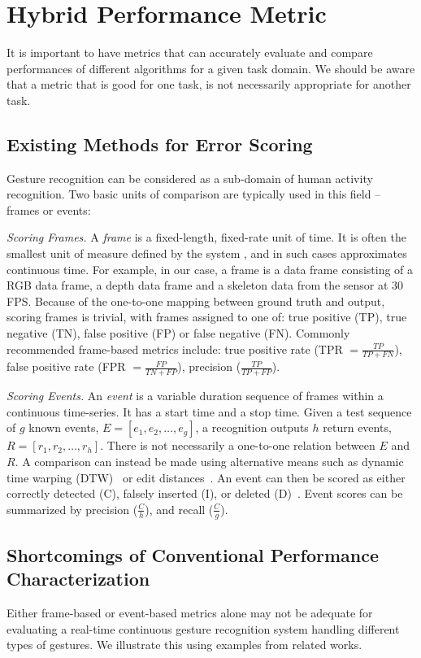 \chapter{Hybrid Performance Metric}
It is important to have metrics that can accurately evaluate and compare
performances of different algorithms for a given task domain. We should
be aware that a metric that is good for one task, is not
necessarily appropriate for another task. 

\section{Existing Methods for Error Scoring}
Gesture recognition can be considered as a sub-domain of human activity
recognition. Two basic units of comparison are typically used in this field
-- frames or events:

\textit{Scoring Frames.} A \textit{frame} is a fixed-length,
fixed-rate unit of time. It is often the smallest unit of measure defined by the system \cite{ward11}, and in such cases approximates continuous time.
For example, in our case, a frame is a data frame consisting of a RGB data frame, a depth data frame and a skeleton data from the
sensor at 30 FPS. Because of the one-to-one mapping between ground truth and
output, scoring frames is trivial, with frames assigned to one of: true positive
(TP), true negative (TN), false positive (FP) or false negative (FN). Commonly
recommended frame-based metrics include: true positive rate (TPR $= \frac{TP}{TP
+ FN}$), false positive rate (FPR $= \frac{FP}{TN + FP}$), precision
($\frac{TP}{TP + FP}$).

\textit{Scoring Events.} An \textit{event} is a variable duration sequence of
frames within a continuous time-series.  It has a start time and a stop time.
Given a test sequence of $g$ known events, $E = [e_1, e_2, \ldots, e_g]$, a
recognition outputs $h$ return events, $R = [r_1, r_2, \ldots, r_h]$. There is
not necessarily a one-to-one relation between $E$ and $R$. A comparison can
instead be made using alternative means such as dynamic time warping
(DTW)~\cite{berndt94} or edit distances~\cite{guyon13}. An event can then be
scored as either correctly detected (C), falsely inserted (I), or deleted
(D)~\cite{ward11}. Event scores can be summarized
by precision ($\frac{C}{h}$), and recall
($\frac{C}{g}$).

\section{Shortcomings of Conventional Performance Characterization}
Either frame-based or event-based metrics 
alone may not be adequate for evaluating a real-time continuous gesture recognition system handling different types of gestures. We illustrate this using examples from related works.

